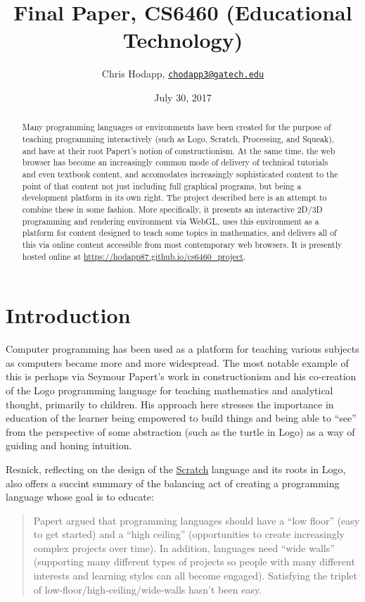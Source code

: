 \documentclass{sig-alternate-05-2015}
\title {Final Paper, CS6460 (Educational Technology)}
\date{July 30, 2017}
\author{Chris Hodapp,
  \href{mailto:chodapp3@gatech.edu}{\nolinkurl{chodapp3@gatech.edu}}}
\begin{document}
\maketitle

\begin{abstract}
  Many programming languages or environments have been created for the
  purpose of teaching programming interactively (such as Logo,
  Scratch, Processing, and Squeak), and have at their root Papert's
  notion of constructionism.  At the same time, the web browser has
  become an increasingly common mode of delivery of technical
  tutorials and even textbook content, and accomodates increasingly
  sophisticated content to the point of that content not just
  including full graphical programs, but being a development platform
  in its own right.  The project described here is an attempt to
  combine these in some fashion.  More specifically, it presents an
  interactive 2D/3D programming and rendering environment via WebGL,
  uses this environment as a platform for content designed to teach
  some topics in mathematics, and delivers all of this via online
  content accessible from most contemporary web browsers.  It is
  presently hosted online at
  \url{https://hodapp87.github.io/cs6460_project}.
\end{abstract}

\section{Introduction}

Computer programming has been used as a platform for teaching various
subjects as computers became more and more widespread.  The most
notable example of this is perhaps via Seymour Papert's work in
constructionism and his co-creation of the Logo programming language
for teaching mathematics and analytical thought, primarily to
children\cite{Stager2016,Papert:1993,Papert:1980,Papert1999}.  His
approach here stresses the importance in education of the learner
being empowered to build things and being able to ``see'' from the
perspective of some abstraction (such as the turtle in Logo) as a way
of guiding and honing intuition.

Resnick, reflecting on the design of the
\href{https://scratch.mit.edu/}{Scratch} language and its roots in
Logo, also offers a succint summary \cite{Resnick2009} of the
balancing act of creating a programming language whose goal is to
educate:

\blockquote{Papert argued that programming languages should have a
  ``low floor'' (easy to get started) and a ``high ceiling''
  (opportunities to create increasingly complex projects over
  time). In addition, languages need ``wide walls'' (supporting many
  different types of projects so people with many different interests
  and learning styles can all become engaged). Satisfying the triplet
  of low-floor/high-ceiling/wide-walls hasn't been
  easy.}
\end{document}
